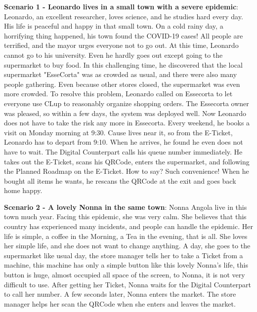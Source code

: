 \documentclass[a4paper,12pt]{report}
\begin{document}
\textbf{Scenario 1 - Leonardo lives in a small town with a severe epidemic}: Leonardo, an excellent researcher, loves science, and he studies hard every day. His life is peaceful and happy in that small town. On a cold rainy day, a horrifying thing happened, his town found the COVID-19 cases! All people are terrified, and the mayor urges everyone not to go out. At this time, Leonardo cannot go to his university. Even he hardly goes out except going to the supermarket to buy food. In this challenging time, he discovered that the local supermarket "EsseCorta" was as crowded as usual, and there were also many people gathering. Even because other stores closed, the supermarket was even more crowded. To resolve this problem, Leonardo called on Essecorta to let everyone use CLup to reasonably organize shopping orders. The Essecorta owner was pleased, so within a few days, the system was deployed well.
Now Leonardo does not have to take the risk any more in Essecorta. Every weekend, he books a visit on Monday morning at 9:30. Cause lives near it, so from the E-Ticket, Leonardo has to depart from 9:10. When he arrives, he found he even does not have to wait. The Digital Counterpart calls his queue number immediately. He takes out the E-Ticket, scans his QRCode, enters the supermarket, and following the Planned Roadmap on the E-Ticket. How to say? Such convenience! When he bought all items he wants, he rescans the QRCode at the exit and goes back home happy.


\textbf{Scenario 2 - A lovely Nonna in the same town}: Nonna Angola live in this town much year. Facing this epidemic, she was very calm. She believes that this country has experienced many incidents, and people can handle the epidemic. Her life is simple, a coffee in the Morning, a Tea in the evening, that is all. She loves her simple life, and she does not want to change anything. A day, she goes to the supermarket like usual day, the store manager tells her to take a Ticket from a machine, this machine has only a simple button like this lovely Nonna's life, this button is huge, almost occupied all space of the screen, to Nonna, it is not very difficult to use. After getting her Ticket, Nonna waits for the Digital Counterpart to call her number. A few seconds later, Nonna enters the market. The store manager helps her scan the QRCode when she enters and leaves the market.
\end{document}
